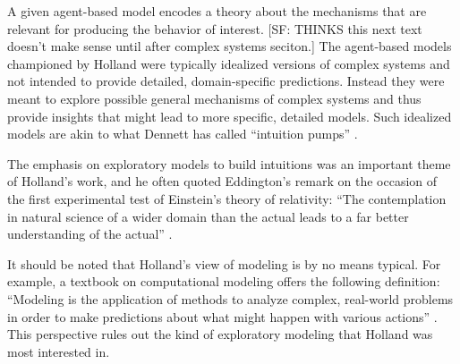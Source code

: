 \documentclass{sig-alternate}
\begin{document}
A given agent-based model encodes a theory about the mechanisms that
are relevant for producing the behavior of interest.  
[SF: THINKS this next text doesn't make sense until after complex
systems seciton.]
The agent-based models
championed by Holland were typically idealized versions of complex
systems and not intended to provide detailed, domain-specific
predictions.  Instead they were meant to explore possible general
mechanisms of complex systems and thus provide insights that might
lead to more specific, detailed models.  Such idealized models are
akin to what Dennett has called ``intuition pumps''
\cite{Dennett1984}.

The emphasis on exploratory models to build intuitions was an
important theme of Holland's work, and he often quoted Eddington's
remark on the occasion of the first experimental test of Einstein's
theory of relativity: ``The contemplation in natural science of a wider
domain than the actual leads to a far better understanding of the
actual'' \cite{Eddington1927}.

It should be noted that Holland's view of modeling is by no means
typical.  For example, a textbook on computational modeling offers
 the following definition: ``Modeling is the application
of methods to analyze complex, real-world problems in order to make
predictions about what might happen with various actions''
\cite{Shiflet2014}.   This perspective rules out the
kind of exploratory modeling that Holland was most interested in. 



\end{document}
